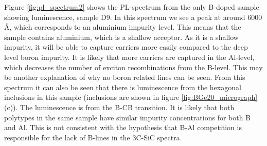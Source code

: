 Figure \ref{fig:pl_spectrum2} shows the PL-spectrum from the only B-doped sample showing luminescence, sample D9. In this spectrum we see a peak at around 6000 Å, which corresponds to an aluminium impurity level. This means that the sample contains aluminium, which is a shallow acceptor. As it is a shallow impurity, it will be able to capture carriers more easily compared to the deep level boron impurity. It is likely that more carriers are captured in the Al-level, which decreases the number of exciton recombinations from the B-level. This may be another explanation of why no boron related lines can be seen. From this spectrum it can also be seen that there is luminescence from the hexagonal inclusions in this sample (inclusions are shown in figure \ref{fig:BGe20_micrograph} (c)). The luminescence is from the B-CB transition. It is likely that both polytypes in the same sample have similar impurity concentrations for both B and Al. This is not consistent with the hypothesis that B-Al competition is responsible for the lack of B-lines in the 3C-SiC spectra. 













































